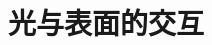        
\chapter{光与表面的交互}\label{chp:intro}\minitoc


\label{chp:hardware}
%
	
\label{chp:pipeline}
%

\label{chp:shading}
%

\label{chp:mc}
%

\label{chp:path-tracing}
%

\label{chp:pm}
%

\label{chp:mlt}
%

\label{chp:rad}
%

\label{chp:ir}
%

